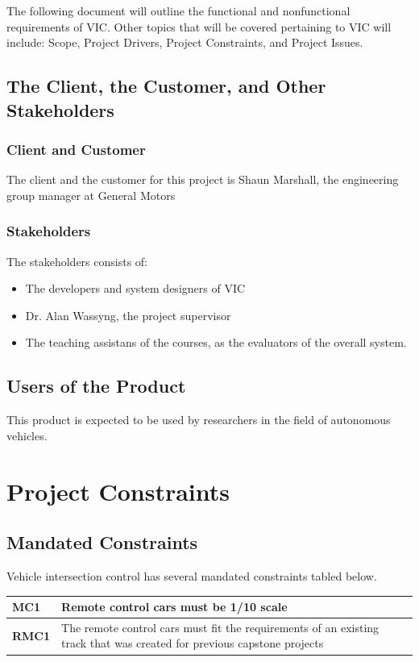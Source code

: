 \documentclass [11pt]{article}
\begin{document}
The following document will outline the functional and nonfunctional requirements of VIC.  Other topics that will be covered pertaining to VIC will include: Scope, Project Drivers, Project Constraints, and Project Issues.

\subsection{The Client, the Customer, and Other Stakeholders}

\subsubsection{Client and Customer}
	The client and the customer for this project is Shaun Marshall, the engineering group manager at General Motors


\subsubsection{Stakeholders}
 
 	The stakeholders consists of:
 		\begin{itemize}

 		\item The developers and system designers of VIC
 		\item Dr. Alan Wassyng, the project supervisor
 		\item The teaching assistans of the courses, as the evaluators of the overall system.
 		\end{itemize} 

\subsection{Users of the Product} 

This product is expected to be used by researchers in the field of autonomous vehicles.



\section{\textbf{Project Constraints}}


\subsection{Mandated Constraints}
Vehicle intersection control has several mandated constraints tabled below. 
\begin{longtable}{| p{ } | p{ } | }\hline 
\textbf{MC1} & \textbf{Remote control cars must be 1/10 scale} \\ \hline
\textbf{RMC1} & The remote control cars must fit the requirements of an existing track that was created for previous capstone projects\\ \hline 

\end{longtable}
\end{document}
